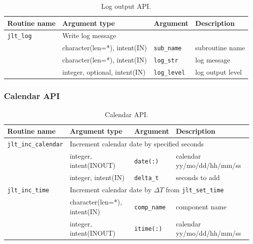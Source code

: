 \documentclass[11pt,a4paper]{report}
\begin{document}
\begin{table}[H]
\begin{center}
\caption{Log output API.}
{\small
\label{table:jlt_api_log}
\begin{tabular}{llll}
\hline\hline
Routine name & Argument type & Argument & Description \\
\hline
 \texttt{jlt\_log} & \multicolumn{3}{l}{Write log message}\\
           &  character(len=*), intent(IN) &  \texttt{sub\_name} & subroutine name\\
           &  character(len=*), intent(IN) &  \texttt{log\_str} & log message\\
           &  integer, optional, intent(IN) &  \texttt{log\_level} & log output level\\
\hline\hline
\end{tabular}
}
\end{center}
\end{table}

\subsubsection{Calendar API}

\begin{table}[H]
\begin{center}
\caption{Calendar API.}
{\small
\label{table:jlt_api_calendar}
\begin{tabular}{llll}
\hline\hline
Routine name & Argument type & Argument & Description \\
\hline
 \texttt{jlt\_inc\_calendar} &  \multicolumn{3}{l}{Increment calendar date by specified seconds}\\
           & integer, intent(INOUT) & \texttt{date(:)}  & calendar yy/mo/dd/hh/mm/ss\\
           & integer, intent(IN) & \texttt{delta\_t} & seconds to add \\
\hline
 \texttt{jlt\_inc\_time} &  \multicolumn{3}{l}{Increment calendar date by $\Delta T$ from \texttt{jlt\_set\_time}}\\
           & character(len=*), intent(IN) & \texttt{comp\_name}  & component name\\
           & integer, intent(INOUT) & \texttt{itime(:)}  & calendar yy/mo/dd/hh/mm/ss\\
\hline\hline
\end{tabular}
}
\end{center}
\end{table}
\end{document}
